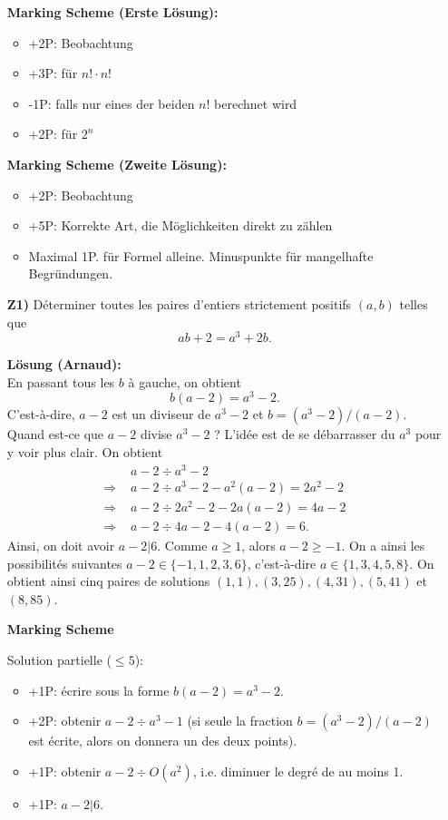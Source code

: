 \documentclass[language=german,style=solution]{smo}
\begin{document}
\begin{enumerate}
\textbf{Marking Scheme (Erste Lösung):}
\begin{itemize}
    \item +2P: Beobachtung
    \item +3P: für $n! \cdot n!$
    \item -1P: falls nur eines der beiden $n!$ berechnet wird
    \item +2P: für $2^n$
\end{itemize} 
\vspace{0.5cm}

\newpage
\textbf{Marking Scheme (Zweite Lösung):}
\begin{itemize}
    \item +2P: Beobachtung
    \item +5P: Korrekte Art, die Möglichkeiten direkt zu zählen
    \item Maximal 1P. für Formel alleine. Minuspunkte für mangelhafte Begründungen.
\end{itemize}

\newpage

\item[\textbf{Z1)}] 
Déterminer toutes les paires d'entiers strictement positifs $(a,b)$ telles que
\[
ab+2 = a^3 + 2b.
\]

\textbf{Lösung (Arnaud):}\\
En passant tous les $b$ à gauche, on obtient
\[
b(a-2)=a^3-2.
\]
C'est-à-dire, $a-2$ est un diviseur de $a^3-2$ et $b=(a^3-2)/(a-2)$. Quand est-ce que $a-2$ divise $a^3-2$ ? L'idée est de se débarrasser du $a^3$ pour y voir plus clair. On obtient
\begin{align*}
& a-2 \div a^3-2\\
\Rightarrow\,\, & a-2\div a^3-2-a^2(a-2)=2a^2-2\\
\Rightarrow\,\, & a-2\div 2a^2-2-2a(a-2)=4a-2\\
\Rightarrow\,\, & a-2\div 4a-2-4(a-2)=6.
\end{align*}
Ainsi, on doit avoir $a-2|6$. Comme $a\geq 1$, alors $a-2\geq -1$. On a ainsi les possibilités suivantes $a-2\in\{-1,1,2,3,6\}$, c'est-à-dire $a\in\{1,3,4,5,8\}$. On obtient ainsi cinq paires de solutions $(1,1),(3,25),(4,31),(5,41)$ et $(8,85)$.

\textbf{Marking Scheme} 

Solution partielle ($\leq 5$):
\begin{itemize}
\item +1P: écrire sous la forme $b(a-2)=a^3-2$.
\item +2P: obtenir $a-2\div a^3-1$ (si seule la fraction $b=(a^3-2)/(a-2)$ est écrite, alors on donnera un des deux points).
\item +1P: obtenir $a-2\div O(a^2)$, i.e. diminuer le degré de au moins 1.
\item +1P: $a-2|6$.
\end{itemize}


\end{enumerate}
\end{document}
